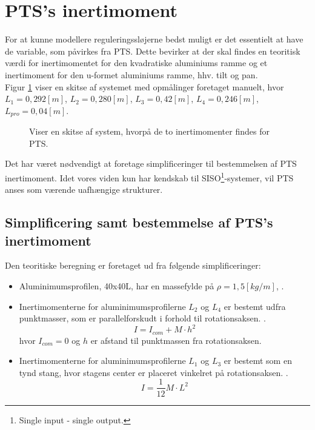 \section{PTS's inertimoment}
\label{sec:teo_PTS}

For at kunne modellere reguleringssløjerne bedst muligt er det essentielt at have de variable, 
som påvirkes fra PTS. Dette bevirker at der skal findes en teoritisk værdi for inertimomentet for den 
kvadratiske aluminiums ramme og et inertimoment for den u-formet aluminiums ramme, hhv. tilt og pan.\\
Figur \ref{fig:inerti_PTS} viser en skitse af systemet med opmålinger foretaget manuelt, hvor ${L_{1}} =0,292 [m]$,
${L_{2}} =0,280 [m]$, ${L_{3}}= 0,42 [m]$, ${L_{4}} =0,246 [m]$, ${L_{pro}}=0,04 [m]$.
\begin{figure}[!th]
\centering
\begin{tikzpicture}[scale=0.8]

\end{tikzpicture}
\caption[Skitse af PTS]{Viser en skitse af system, hvorpå de to inertimomenter findes for PTS.}
\label{fig:inerti_PTS}
\end{figure}

Det har været nødvendigt at foretage simplificeringer til bestemmelsen af PTS inertimoment. 
Idet vores viden kun har kendskab til SISO\footnote{Single input - single output.}-systemer, vil PTS anses som værende uafhængige strukturer. 

\subsection{Simplificering samt bestemmelse af PTS's inertimoment}
Den teoritiske beregning er foretaget ud fra følgende simplificeringer:
\begin{itemize}
\item Aluminimumsprofilen, 40x40L, har en massefylde på $\rho=1,5 [kg/m]$, \citep[Kap. 2 side. 4]{alu_profil_desitet}. 
\item Inertimomenterne for aluminimumsprofilerne ${L_{2}}$ og ${L_{4}}$ er bestemt udfra punktmasser, som er parallelforskudt i forhold til rotationsaksen. \citep[Side. 254, ligning 10-36]{fund_of_physics}.
\begin{equation}
I={ I }_{ com }+M\cdot { h }^{ 2 }
\label{eq:punktmasse_para} 
\end{equation}
hvor ${I_{com}} = 0$ og $h$ er afstand til punktmassen fra rotationsaksen.
\item Inertimomenterne for aluminimumsprofilerne ${L_{1}}$ og ${L_{3}}$ er bestemt som en tynd stang, hvor stagens center er placeret vinkelret på rotationsaksen. \citep[Side. 255, tabel 10-2e]{fund_of_physics}.
\begin{equation}
I=\frac { 1 }{ 12 } M\cdot { L }^{ 2 }
\label{eq:punktmasse_para} 
\end{equation}
\end{itemize}

